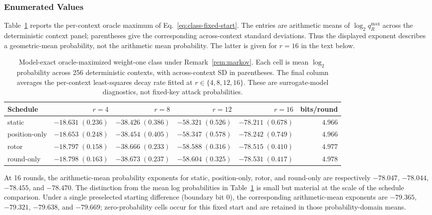 \documentclass[cryptography,article,submit,oneauthor]{Definitions/mdpi}
\begin{document}
\subsubsection{Enumerated Values}\label{sec:3-7-2}

Table~\ref{tab:4} reports the per-context oracle maximum of Eq.~\eqref{eq:class-fixed-start}. The entries are arithmetic means of $\log_2 q_R^{\max}$ across the deterministic context panel; parentheses give the corresponding across-context standard deviations. Thus the displayed exponent describes a geometric-mean probability, not the arithmetic mean probability. The latter is given for $r=16$ in the text below.

\begin{table}[t]
\caption{Model-exact oracle-maximized weight-one class under Remark~\ref{rem:markov}. Each cell is mean $\log_2$ probability across 256 deterministic contexts, with across-context SD in parentheses. The final column averages the per-context least-squares decay rate fitted at $r\in\{4,8,12,16\}$. These are surrogate-model diagnostics, not fixed-key attack probabilities.}\label{tab:4}
\centering\scriptsize
\begin{tabular}{@{}lrrrrr@{}}
\toprule
Schedule & $r=4$ & $r=8$ & $r=12$ & $r=16$ & bits/round \\
\midrule
static & $-18.631\;(0.236)$ & $-38.426\;(0.386)$ & $-58.321\;(0.526)$ & $-78.211\;(0.678)$ & $4.966$ \\
position-only & $-18.653\;(0.248)$ & $-38.454\;(0.405)$ & $-58.347\;(0.578)$ & $-78.242\;(0.749)$ & $4.966$ \\
rotor & $-18.797\;(0.158)$ & $-38.666\;(0.233)$ & $-58.588\;(0.316)$ & $-78.515\;(0.410)$ & $4.977$ \\
round-only & $-18.798\;(0.163)$ & $-38.673\;(0.237)$ & $-58.604\;(0.325)$ & $-78.531\;(0.417)$ & $4.978$ \\
\bottomrule
\end{tabular}
\end{table}

At 16 rounds, the arithmetic-mean probability exponents for static, position-only, rotor, and round-only are respectively $-78.047$, $-78.044$, $-78.455$, and $-78.470$. The distinction from the mean log probabilities in Table~\ref{tab:4} is small but material at the scale of the schedule comparison. Under a single preselected starting difference (boundary bit 0), the corresponding arithmetic-mean exponents are $-79.365$, $-79.321$, $-79.638$, and $-79.669$; zero-probability cells occur for this fixed start and are retained in those probability-domain means.
\end{document}
